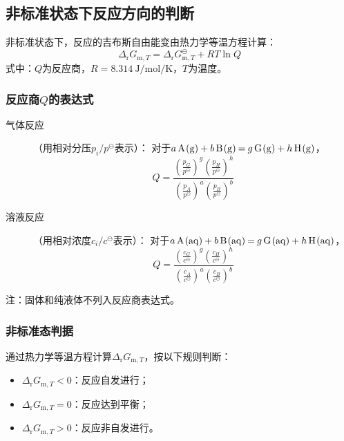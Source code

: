 \subsection{非标准状态下反应方向的判断}
非标准状态下，反应的吉布斯自由能变由热力学等温方程计算：
\[
\Delta_{\text{r}}G_{\text{m},T} = \Delta_{\text{r}}G_{\text{m},T}^\ominus + RT\ln Q
\]
式中：$Q$为反应商，$R=\qty{8.314}{\joule\per\mole\per\kelvin}$，$T$为温度。

\subsubsection{反应商$Q$的表达式}
\begin{description}
    \item[气体反应]（用相对分压$p_i/p^\ominus$表示）：  
    对于$\ce{a A(g) + b B(g) = g G(g) + h H(g)}$，
    \[
    Q = \frac{\left(\frac{p_G}{p^\ominus}\right)^g \left(\frac{p_H}{p^\ominus}\right)^h}{\left(\frac{p_A}{p^\ominus}\right)^a \left(\frac{p_B}{p^\ominus}\right)^b}
    \]
    \item[溶液反应]（用相对浓度$c_i/c^\ominus$表示）：  
    对于$\ce{a A(aq) + b B(aq) = g G(aq) + h H(aq)}$，
    \[
    Q = \frac{\left(\frac{c_G}{c^\ominus}\right)^g \left(\frac{c_H}{c^\ominus}\right)^h}{\left(\frac{c_A}{c^\ominus}\right)^a \left(\frac{c_B}{c^\ominus}\right)^b}
    \]
\end{description}
注：固体和纯液体不列入反应商表达式。

\subsubsection{非标准态判据}
通过热力学等温方程计算$\Delta_{\text{r}}G_{\text{m},T}$，按以下规则判断：
\begin{itemize}
    \item $\Delta_{\text{r}}G_{\text{m},T}<0$：反应自发进行；
    \item $\Delta_{\text{r}}G_{\text{m},T}=0$：反应达到平衡；
    \item $\Delta_{\text{r}}G_{\text{m},T}>0$：反应非自发进行。
\end{itemize}